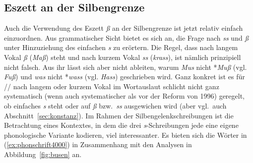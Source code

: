 
\subsection[Eszett an der Silbengrenze]{\Opsional Eszett an der Silbengrenze}

\label{sec:eszett}

Auch die Verwendung des Eszett \textit{ß} an der Silbengrenze ist jetzt relativ einfach einzuordnen.
Aus grammatischer Sicht bietet es sich an, die Frage nach \textit{ss} und \textit{ß} unter Hinzuziehung des einfachen \textit{s} zu erörtern.
Die Regel, dass nach langem Vokal \textit{ß} (\textit{Maß}) steht und nach kurzem Vokal \textit{ss} (\textit{krass}), ist nämlich prinzipiell nicht falsch.
Aus ihr lässt sich aber nicht ableiten, warum \zB \textit{Mus} nicht *\textit{Muß} (vgl. \textit{Fuß}) und \textit{was} nicht *\textit{wass} (vgl. \textit{Hass}) geschrieben wird.
Ganz konkret ist es für // nach langem oder kurzem Vokal im Wortauslaut schlicht nicht ganz systematisch (wenn auch systematischer als vor der Reform von 1996) geregelt, ob einfaches \textit{s} steht oder auf \textit{ß} bzw.\ \textit{ss} ausgewichen wird (aber vgl.\ auch Abschnitt~\ref{sec:konstanz}).
Im Rahmen der Silbengelenkschreibungen ist die Betrachtung eines Kontextes, in dem die drei \textit{s}-Schreibungen jede eine eigene phonologische Variante kodieren, viel interessanter.
Es bieten sich die Wörter in (\ref{ex:phonschrift4000}) in Zusammenhang mit den Analysen in Abbildung~\ref{fig:busen} an.

\begin{exe}
  \ex\label{ex:phonschrift4000} 
  \begin{xlist}
  \end{xlist}
\end{exe}

